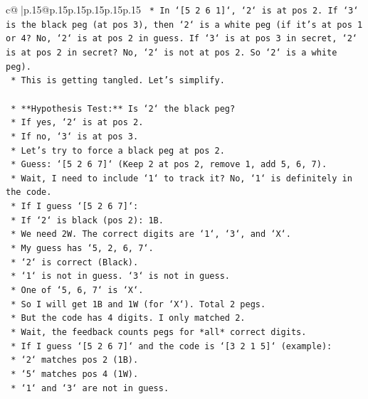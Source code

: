 \documentclass{article}
\begin{document}
{\begin{supertabular}{c@{$\;$}|p{.15\linewidth}@{}p{.15\linewidth}p{.15\linewidth}p{.15\linewidth}p{.15\linewidth}p{.15\linewidth}}
{{{\texttt{        *   In `{[}5 2 6 1{]}`, `2` is at pos 2. If `3` is the black peg (at pos 3), then `2` is a white peg (if it's at pos 1 or 4? No, `2` is at pos 2 in guess. If `3` is at pos 3 in secret, `2` is at pos 2 in secret? No, `2` is not at pos 2. So `2` is a white peg).} \\
\texttt{        *   This is getting tangled. Let's simplify.} \\
\\ 
\texttt{    *   **Hypothesis Test:** Is `2` the black peg?} \\
\texttt{        *   If yes, `2` is at pos 2.} \\
\texttt{        *   If no, `3` is at pos 3.} \\
\texttt{    *   Let's try to force a black peg at pos 2.} \\
\texttt{    *   Guess: `{[}5 2 6 7{]}` (Keep 2 at pos 2, remove 1, add 5, 6, 7).} \\
\texttt{        *   Wait, I need to include `1` to track it? No, `1` is definitely in the code.} \\
\texttt{        *   If I guess `{[}5 2 6 7{]}`:} \\
\texttt{            *   If `2` is black (pos 2): 1B.} \\
\texttt{            *   We need 2W. The correct digits are `1`, `3`, and `X`.} \\
\texttt{            *   My guess has `5, 2, 6, 7`.} \\
\texttt{            *   `2` is correct (Black).} \\
\texttt{            *   `1` is not in guess. `3` is not in guess.} \\
\texttt{            *   One of `5, 6, 7` is `X`.} \\
\texttt{            *   So I will get 1B and 1W (for `X`). Total 2 pegs.} \\
\texttt{            *   But the code has 4 digits. I only matched 2.} \\
\texttt{            *   Wait, the feedback counts pegs for *all* correct digits.} \\
\texttt{            *   If I guess `{[}5 2 6 7{]}` and the code is `{[}3 2 1 5{]}` (example):} \\
\texttt{                *   `2` matches pos 2 (1B).} \\
\texttt{                *   `5` matches pos 4 (1W).} \\
\texttt{                *   `1` and `3` are not in guess.} \\
}}}
\end{supertabular}}
\end{document}
